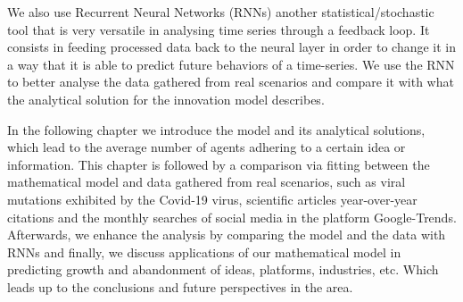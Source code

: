 We also use Recurrent Neural Networks (RNNs) another statistical/stochastic tool that is very versatile in analysing time series through a feedback loop. It consists in feeding processed data back to the neural layer in order to change it in a way that it is able to predict future behaviors of a time-series. We use the RNN to better analyse the data gathered from real scenarios and compare it with what the analytical solution for the innovation model describes.

In the following chapter we introduce the model and its analytical solutions, which lead to the average number of agents adhering to a certain idea or information. This chapter is followed by a comparison via fitting between the mathematical model and data gathered from real scenarios, such as viral mutations exhibited by the Covid-19 virus, scientific articles year-over-year citations and the monthly searches of social media in the platform Google-Trends. Afterwards, we enhance the analysis by comparing the model and the data with RNNs and finally, we discuss applications of our mathematical model in predicting growth and abandonment of ideas, platforms, industries, etc. Which leads up to the conclusions and future perspectives in the area.
